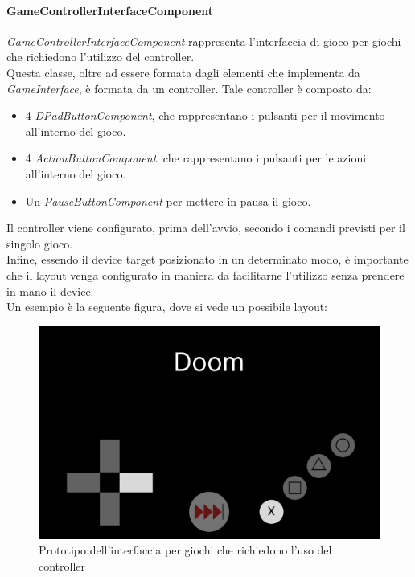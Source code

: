 \paragraph{GameControllerInterfaceComponent}
\emph{GameControllerInterfaceComponent} rappresenta l'interfaccia di gioco per giochi che richiedono l'utilizzo del controller.\\
Questa classe, oltre ad essere formata dagli elementi che implementa da \emph{GameInterface}, è formata da un controller. Tale controller è composto da:
\begin{itemize}
    \item 4 \emph{DPadButtonComponent}, che rappresentano i pulsanti per il movimento all'interno del gioco.
    \item 4 \emph{ActionButtonComponent}, che rappresentano i pulsanti per le azioni\\ all'interno del gioco.
    \item Un \emph{PauseButtonComponent} per mettere in pausa il gioco.
\end{itemize}
Il controller viene configurato, prima dell'avvio, secondo i comandi previsti per il singolo gioco.\\
Infine, essendo il device target posizionato in un determinato modo, è importante che il layout venga configurato in maniera da facilitarne l'utilizzo senza prendere in mano il device.\\
Un esempio è la seguente figura, dove si vede un possibile layout:
\begin{figure}[h]
    \centering
    \includegraphics[width=340pt]{images/prog/ControllerMockup.png}
    \caption{Prototipo dell'interfaccia per giochi che richiedono l'uso del controller}
    \label{fig:controller}
\end{figure}
